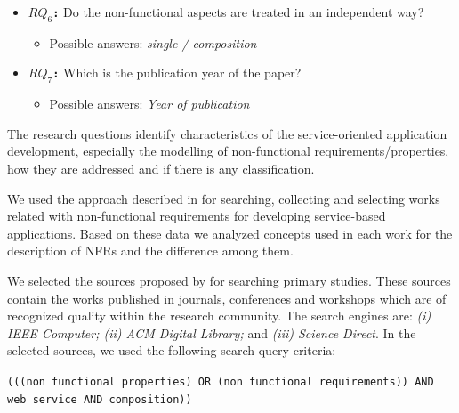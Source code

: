 \documentclass{sig-alternate}
\begin{document}
\begin{itemize}
\begin{itemize}
	\end{itemize}  
  \item \textbf{\texttt{$RQ_6$:}} Do the non-functional aspects are treated in
  an independent way?
\begin{itemize}
	  \item Possible answers: \textit{single / composition}
	\end{itemize}
\item \textbf{\texttt{$RQ_7$:}} Which is the publication year of the paper?
	\begin{itemize}
	  \item Possible answers: \textit{Year of publication}
	\end{itemize}	   
\end{itemize}



 
The research questions identify characteristics
 of the ser\-vice-oriented application development, especially the
modelling of non-functional requirements/properties, how they are addressed and
if there is any classification.   

\bigskip

We used the approach described in \cite{Kitchenham08} for searching,
collecting and selecting works related with non-functional requirements for
developing service-based applications. Based on these data we analyzed concepts used
in each work for the description of NFRs and the difference among them. 

We selected the sources proposed by \cite{Kitchenham08} for searching primary
studies. These sources contain the works published in journals, conferences and
workshops which are of recognized quality within the research community. The
search engines are: \textit{(i) IEEE Computer; (ii) ACM Digital Library;} and
\textit{(iii) Science Direct}. In the selected sources, we used the following search
query criteria:

\begin{center}
\texttt{(((non functional properties) OR (non functional requirements))
AND web service AND composition))}
\end{center}
\end{document}
